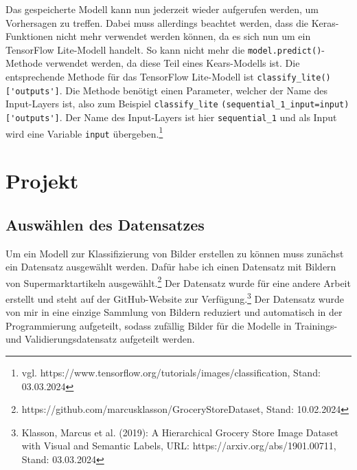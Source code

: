 \documentclass[11pt,oneside]{report}
\begin{document}
Das gespeicherte Modell kann nun jederzeit wieder aufgerufen werden, um Vorhersagen zu treffen. Dabei muss allerdings beachtet werden, dass die Keras-Funktionen nicht mehr verwendet werden können, da es sich nun um ein TensorFlow Lite-Modell handelt. So kann nicht mehr die \verb+model.predict()+-Methode verwendet werden, da diese Teil eines Kears-Modells ist. Die entsprechende Methode für das TensorFlow Lite-Modell ist \verb+classify_lite()['outputs']+. Die Methode benötigt einen Parameter, welcher der Name des Input-Layers ist, also zum Beispiel \verb+classify_lite+ \verb+(sequential_1_input=input)['outputs']+. Der Name des Input-Layers ist hier \verb+sequential_1+ und als Input wird eine Variable \verb+input+ übergeben.\footnote{vgl. https://www.tensorflow.org/tutorials/images/classification, Stand: 03.03.2024}


\chapter{Projekt}

\section{Auswählen des Datensatzes}
Um ein Modell zur Klassifizierung von Bilder erstellen zu können muss zunächst ein Datensatz ausgewählt werden. Dafür habe ich einen Datensatz mit Bildern von Supermarktartikeln ausgewählt.\footnote{https://github.com/marcusklasson/GroceryStoreDataset, Stand: 10.02.2024} Der Datensatz wurde für eine andere Arbeit erstellt und steht auf der GitHub-Website zur Verfügung.\footnote{Klasson, Marcus et al. (2019): A Hierarchical Grocery Store Image Dataset with Visual and Semantic Labels, URL: https://arxiv.org/abs/1901.00711, Stand: 03.03.2024} Der Datensatz wurde von mir in eine einzige Sammlung von Bildern reduziert und automatisch in der Programmierung aufgeteilt, sodass zufällig Bilder für die Modelle in Trainings- und Validierungsdatensatz aufgeteilt werden.
\end{document}
